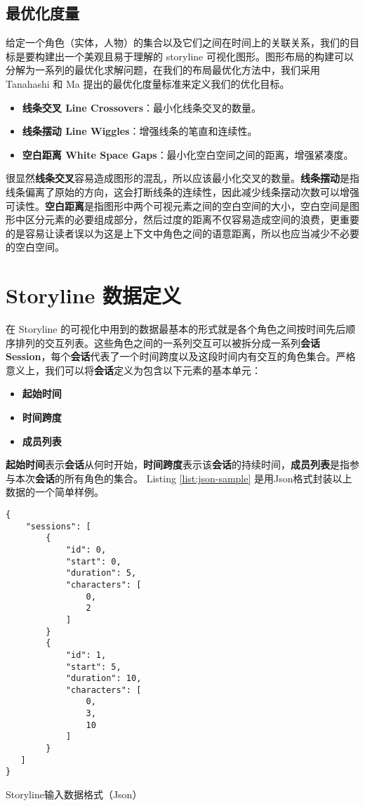 \subsection{最优化度量}
\label{metrics}
给定一个角色（实体，人物）的集合以及它们之间在时间上的关联关系，我们的目标是要构建出一个美观且易于理解的 storyline 可视化图形。图形布局的构建可以分解为一系列的最优化求解问题，在我们的布局最优化方法中，我们采用 Tanahashi 和 Ma \cite{tanahashi2012design} 提出的最优化度量标准来定义我们的优化目标。
\begin{itemize}
\item \textbf{线条交叉 Line Crossovers}：最小化线条交叉的数量。
\item \textbf{线条摆动 Line Wiggles}：增强线条的笔直和连续性。
\item \textbf{空白距离 White Space Gaps}：最小化空白空间之间的距离，增强紧凑度。
\end{itemize}
很显然\textbf{线条交叉}容易造成图形的混乱，所以应该最小化交叉的数量。\textbf{线条摆动}是指线条偏离了原始的方向，这会打断线条的连续性，因此减少线条摆动次数可以增强可读性。\textbf{空白距离}是指图形中两个可视元素之间的空白空间的大小，空白空间是图形中区分元素的必要组成部分，然后过度的距离不仅容易造成空间的浪费，更重要的是容易让读者误以为这是上下文中角色之间的语意距离，所以也应当减少不必要的空白空间。

\section{Storyline 数据定义}
在 Storyline 的可视化中用到的数据最基本的形式就是各个角色之间按时间先后顺序排列的交互列表。这些角色之间的一系列交互可以被拆分成一系列\textbf{会话 Session}，每个\textbf{会话}代表了一个时间跨度以及这段时间内有交互的角色集合。严格意义上，我们可以将\textbf{会话}定义为包含以下元素的基本单元：
\begin{itemize}
\item \textbf{起始时间}
\item \textbf{时间跨度}
\item \textbf{成员列表}
\end{itemize}
\textbf{起始时间}表示\textbf{会话}从何时开始，\textbf{时间跨度}表示该\textbf{会话}的持续时间，\textbf{成员列表}是指参与本次\textbf{会话}的所有角色的集合。 Listing \ref{list:json-sample} 是用Json格式封装以上数据的一个简单样例。
\begin{listing}
\linespread{0.9}
\begin{verbatim}
{
    "sessions": [
        {
            "id": 0,
            "start": 0,
            "duration": 5,
            "characters": [
                0,
                2
            ]
        }
        {
            "id": 1,
            "start": 5,
            "duration": 10,
            "characters": [
                0,
                3,
                10
            ]
        }
   ]
}
\end{verbatim}
\caption{Storyline输入数据格式（Json）} 
\label{list:json-sample}
\end{listing}

